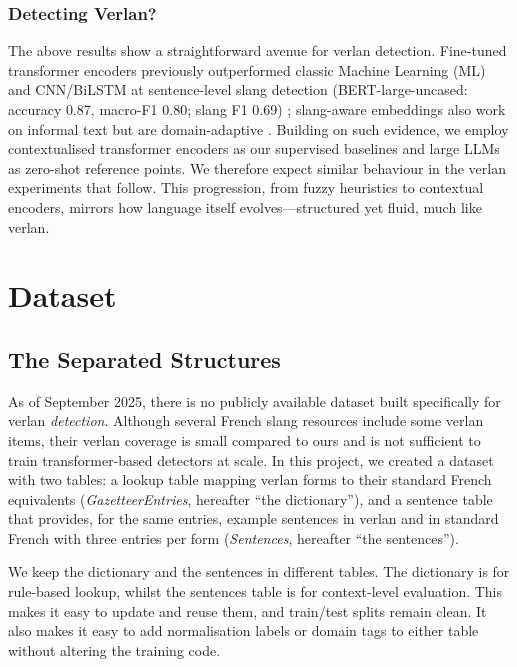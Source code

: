 \documentclass[12pt]{article}
\begin{document}
\subsubsection{Detecting Verlan?}

The above results show a straightforward avenue for verlan detection. Fine-tuned transformer encoders previously outperformed classic Machine Learning (ML) and CNN/BiLSTM at sentence-level slang detection (BERT-large-uncased: accuracy 0.87, macro-F1 0.80; slang F1 0.69) \cite{slangornot2024}; slang-aware embeddings also work on informal text but are domain-adaptive \cite{urban2020embeddings}. Building on such evidence, we employ contextualised transformer encoders as our supervised baselines and large LLMs as zero-shot reference points. We therefore expect similar behaviour in the verlan experiments that follow. This progression, from fuzzy heuristics to contextual encoders, mirrors how language itself evolves\;---\;structured yet fluid, much like verlan.

\section{Dataset}
\subsection{The Separated Structures}
As of September 2025, there is no publicly available dataset built specifically for verlan \textit{detection}. Although several French slang resources include some verlan items, their verlan coverage is small compared to ours and is not sufficient to train transformer-based detectors at scale. In this project, we created a dataset with two tables: a lookup table mapping verlan forms to their standard French equivalents (\textit{GazetteerEntries}, hereafter ``the dictionary''), and a sentence table that provides, for the same entries, example sentences in verlan and in standard French with three entries per form (\textit{Sentences}, hereafter ``the sentences'').

We keep the dictionary and the sentences in different tables. The dictionary is for rule-based lookup, whilst the sentences table is for context-level evaluation. This makes it easy to update and reuse them, and train/test splits remain clean. It also makes it easy to add normalisation labels or domain tags to either table without altering the training code.

\vspace{0.5em}
\end{document}
